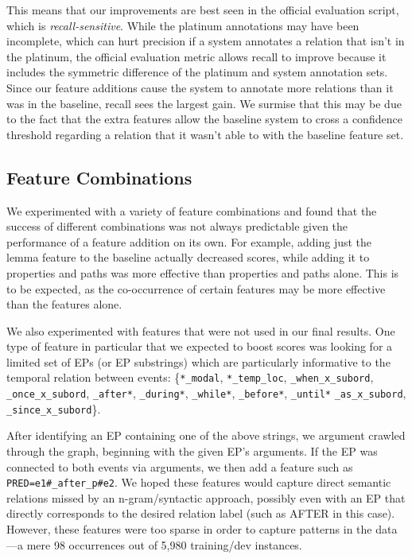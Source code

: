 \documentclass[11pt]{article}
\begin{document}
This means that our improvements are best seen in the official evaluation script, which is \emph{recall-sensitive}. While the platinum annotations may have been incomplete, which can hurt precision if a system annotates a relation that isn't in the platinum, the official evaluation metric allows recall to improve because it includes the symmetric difference of the platinum and system annotation sets. Since our feature additions cause the system to annotate more relations than it was in the baseline, recall sees the largest gain. We surmise that this may be due to the fact that the extra features allow the baseline system to cross a confidence threshold regarding a relation that it wasn't able to with the baseline feature set.

\subsection{Feature Combinations}

We experimented with a variety of feature combinations and found that the success of different combinations was not always predictable given the performance of a feature addition on its own. For example, adding just the lemma feature to the baseline actually decreased scores, while adding it to properties and paths was more effective than properties and paths alone. This is to be expected, as the co-occurrence of certain features may be more effective than the features alone.

We also experimented with features that were not used in our final results. One type of feature in particular that we expected to boost scores was looking for a limited set of EPs (or EP substrings) which are particularly informative to the temporal relation between events: \{\texttt{*\_modal}, \texttt{*\_temp\_loc}, \texttt{\_when\_x\_subord}, \texttt{\_once\_x\_subord}, \texttt{\_after*}, \texttt{\_during*}, \texttt{\_while*}, \texttt{\_before*}, \texttt{\_until*} \texttt{\_as\_x\_subord}, \texttt{\_since\_x\_subord}\}.

After identifying an EP containing one of the above strings, we argument crawled through the graph, beginning with the given EP's arguments. If the  EP was connected to both events via arguments, we then add a feature such as \texttt{PRED=e1\#\_after\_p\#e2}. We hoped these features would capture direct semantic relations missed by an n-gram/syntactic approach, possibly even with an EP that directly corresponds to the desired relation label (such as AFTER in this case). However, these features were too sparse in order to capture patterns in the data---a mere 98 occurrences out of 5,980 training/dev instances.
\end{document}
